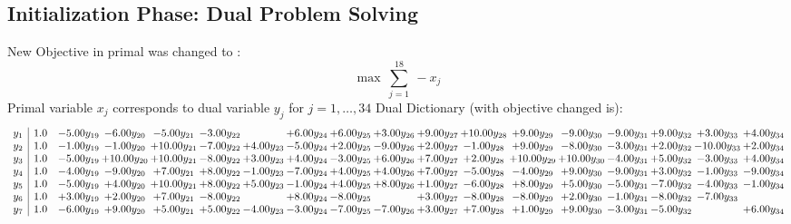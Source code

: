 \documentclass[9pt]{article}
\begin{document}
\subsection{Initialization Phase: Dual Problem Solving}
New Objective in primal was changed to : \[ \max\ \sum_{j=1}^{18}\ - x_j \] 
Primal variable $x_j$ corresponds to dual variable $y_j$ for $j = 1,\ldots,34$
Dual Dictionary (with objective changed is): 
\[\begin{array}{c| c c@{\hskip 2pt} c@{\hskip 2pt} c@{\hskip 2pt} c@{\hskip 2pt} c@{\hskip 2pt} c@{\hskip 2pt} c@{\hskip 2pt} c@{\hskip 2pt} c@{\hskip 2pt} c@{\hskip 2pt} c@{\hskip 2pt} c@{\hskip 2pt} c@{\hskip 2pt} c@{\hskip 2pt} c@{\hskip 2pt} c@{\hskip 2pt} }
 y_{1}   &  1.0 & -5.00 y_{19} & -6.00 y_{20} & -5.00 y_{21} & -3.00 y_{22} &   & +  6.00 y_{24} & +  6.00 y_{25} & +  3.00 y_{26} & +  9.00 y_{27} & + 10.00 y_{28} & +  9.00 y_{29} & -9.00 y_{30} & -9.00 y_{31} & +  9.00 y_{32} & +  3.00 y_{33} & +  4.00 y_{34}\\
 y_{2}   &  1.0 & -1.00 y_{19} & -1.00 y_{20} & + 10.00 y_{21} & -7.00 y_{22} & +  4.00 y_{23} & -5.00 y_{24} & +  2.00 y_{25} & -9.00 y_{26} & +  2.00 y_{27} & -1.00 y_{28} & +  9.00 y_{29} & -8.00 y_{30} & -3.00 y_{31} & +  2.00 y_{32} & -10.00 y_{33} & +  2.00 y_{34}\\
 y_{3}   &  1.0 & -5.00 y_{19} & + 10.00 y_{20} & + 10.00 y_{21} & -8.00 y_{22} & +  3.00 y_{23} & +  4.00 y_{24} & -3.00 y_{25} & +  6.00 y_{26} & +  7.00 y_{27} & +  2.00 y_{28} & + 10.00 y_{29} & + 10.00 y_{30} & -4.00 y_{31} & +  5.00 y_{32} & -3.00 y_{33} & +  4.00 y_{34}\\
 y_{4}   &  1.0 & -4.00 y_{19} & -9.00 y_{20} & +  7.00 y_{21} & +  8.00 y_{22} & -1.00 y_{23} & -7.00 y_{24} & +  4.00 y_{25} & +  4.00 y_{26} & +  7.00 y_{27} & -5.00 y_{28} & -4.00 y_{29} & +  9.00 y_{30} & -9.00 y_{31} & +  3.00 y_{32} & -1.00 y_{33} & -9.00 y_{34}\\
 y_{5}   &  1.0 & -5.00 y_{19} & +  4.00 y_{20} & + 10.00 y_{21} & +  8.00 y_{22} & +  5.00 y_{23} & -1.00 y_{24} & +  4.00 y_{25} & +  8.00 y_{26} & +  1.00 y_{27} & -6.00 y_{28} & +  8.00 y_{29} & +  5.00 y_{30} & -5.00 y_{31} & -7.00 y_{32} & -4.00 y_{33} & -1.00 y_{34}\\
 y_{6}   &  1.0 & +  3.00 y_{19} & +  2.00 y_{20} & +  7.00 y_{21} & -8.00 y_{22} &   & +  8.00 y_{24} & -8.00 y_{25} &   & +  3.00 y_{27} & -8.00 y_{28} & -8.00 y_{29} & +  2.00 y_{30} & -1.00 y_{31} & -8.00 y_{32} & -7.00 y_{33} &   \\
 y_{7}   &  1.0 & -6.00 y_{19} & +  9.00 y_{20} & +  5.00 y_{21} & +  5.00 y_{22} & -4.00 y_{23} & -3.00 y_{24} & -7.00 y_{25} & -7.00 y_{26} & +  3.00 y_{27} & +  7.00 y_{28} & +  1.00 y_{29} & +  9.00 y_{30} & -3.00 y_{31} & -5.00 y_{32} &   & +  6.00 y_{34}\\

\end{array}\]
\end{document}

